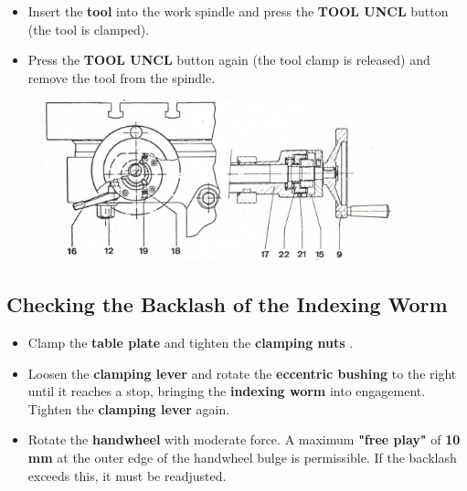 \begin{itemize}
    \item Insert the \textbf{tool} into the work spindle and press the \textbf{TOOL UNCL} button (the tool is clamped).\footnotemark[1]
    \item Press the \textbf{TOOL UNCL} button again (the tool clamp is released) and remove the tool from the spindle.
\end{itemize}




\setcounter{section}{40}

\begin{figure}[H]
    \centering
    \includegraphics[width=0.9\textwidth]{images/chapter7/rotary_table_adjustment.jpg}
    \label{fig:rotary_table_adjustment}
\end{figure}

\subsection*{Checking the Backlash of the Indexing Worm}

\begin{itemize}
    \item Clamp the \textbf{table plate} and tighten the \textbf{clamping nuts }.
    \item Loosen the \textbf{clamping lever } and rotate the \textbf{eccentric bushing } to the right until it reaches a stop, bringing the \textbf{indexing worm} into engagement. Tighten the \textbf{clamping lever } again.
    \item Rotate the \textbf{handwheel } with moderate force.  
          A maximum \textbf{"free play"} of \textbf{10 mm} at the outer edge of the handwheel bulge is permissible.  
          If the backlash exceeds this, it must be readjusted.
\end{itemize}

